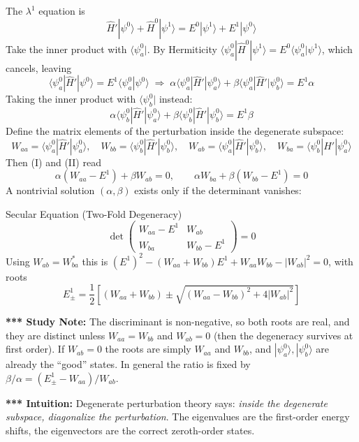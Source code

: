 \documentclass[11pt,a4paper]{article}
\begin{document}
The $\lambda^1$ equation is
\[
\hat H'|\psi^0\rangle + \hat H^0|\psi^1\rangle = E^0|\psi^1\rangle + E^1|\psi^0\rangle
\]
Take the inner product with $\langle\psi_a^0|$. By Hermiticity $\langle\psi_a^0|\hat H^0|\psi^1\rangle = E^0\langle\psi_a^0|\psi^1\rangle$, which cancels, leaving
\[
\langle\psi_a^0|\hat H'|\psi^0\rangle = E^1\langle\psi_a^0|\psi^0\rangle
\;\Longrightarrow\;
\alpha\langle\psi_a^0|\hat H'|\psi_a^0\rangle + \beta\langle\psi_a^0|\hat H'|\psi_b^0\rangle = E^1\alpha \tag{I}
\]
Taking the inner product with $\langle\psi_b^0|$ instead:
\[
\alpha\langle\psi_b^0|\hat H'|\psi_a^0\rangle + \beta\langle\psi_b^0|\hat H'|\psi_b^0\rangle = E^1\beta \tag{II}
\]
Define the matrix elements of the perturbation inside the degenerate subspace:
\[
W_{aa} = \langle\psi_a^0|\hat H'|\psi_a^0\rangle,\quad W_{bb} = \langle\psi_b^0|\hat H'|\psi_b^0\rangle,\quad W_{ab} = \langle\psi_a^0|\hat H'|\psi_b^0\rangle,\quad W_{ba} = \langle\psi_b^0|\hat H'|\psi_a^0\rangle
\]
Then (I) and (II) read
\[
\alpha(W_{aa} - E^1) + \beta W_{ab} = 0, \qquad \alpha W_{ba} + \beta(W_{bb} - E^1) = 0
\]
A nontrivial solution $(\alpha,\beta)$ exists only if the determinant vanishes:
\begin{thm}{Secular Equation (Two-Fold Degeneracy)}
\[
\det\begin{pmatrix} W_{aa}-E^1 & W_{ab} \\ W_{ba} & W_{bb}-E^1 \end{pmatrix} = 0
\]
Using $W_{ab} = W_{ba}^*$ this is $(E^1)^2 - (W_{aa}+W_{bb})E^1 + W_{aa}W_{bb} - |W_{ab}|^2 = 0$, with roots
\[
E^1_{\pm} = \frac12\left[(W_{aa}+W_{bb}) \pm \sqrt{(W_{aa}-W_{bb})^2 + 4|W_{ab}|^2}\right]
\]
\end{thm}
\textbf{*** Study Note:} The discriminant is non-negative, so both roots are real, and they are distinct unless $W_{aa}=W_{bb}$ and $W_{ab}=0$ (then the degeneracy survives at first order). If $W_{ab}=0$ the roots are simply $W_{aa}$ and $W_{bb}$, and $|\psi_a^0\rangle,|\psi_b^0\rangle$ are already the ``good'' states. In general the ratio is fixed by $\beta/\alpha = (E^1_\pm - W_{aa})/W_{ab}$.

\textbf{*** Intuition:} Degenerate perturbation theory says: \textit{inside the degenerate subspace, diagonalize the perturbation}. The eigenvalues are the first-order energy shifts, the eigenvectors are the correct zeroth-order states.
\end{document}
